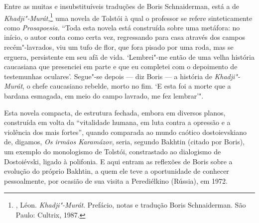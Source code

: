 Entre as muitas e insubstituíveis traduções de Boris Schnaiderman, está
a de \emph{Khadji"-Murát},\footnote{, Léon. \emph{Khadji"-Murát}.
  Prefácio, notas e tradução Boris Schnaiderman. São Paulo: Cultrix,
  1987.} uma novela de Tolstói à qual o professor se refere
sinteticamente como \emph{Prosapoesia}. ``Toda esta novela está
construída sobre uma metáfora: no início, o autor conta como certa vez,
regressando para casa através dos campos recém"-lavrados, viu um tufo de
flor, que fora pisado por uma roda, mas se erguera, persistente em seu
afã de vida. `Lembrei"-me então de uma velha história caucasiana que
presenciei em parte e que eu completei com o depoimento de testemunhas
oculares'. Segue"-se depois --- diz Boris --- a história de
\emph{Khadji"-Murát}, o chefe caucasiano rebelde, morto no fim. `E esta
foi a morte que a bardana esmagada, em meio do campo lavrado, me fez
lembrar'".

Esta novela compacta, de estrutura fechada, embora em diversos planos,
construída em volta da ``vitalidade humana, em luta contra a opressão e
a violência dos mais fortes'', quando comparada ao mundo caótico
dostoievskiano de, digamos, \emph{Os irmãos Karamázov}, seria, segundo
Bakhtin (citado por Boris), um exemplo do monologismo de Tolstói,
constrastado ao dialogismo de Dostoiévski, ligado à polifonia. E aqui
entram as reflexões de Boris sobre a evolução do próprio Bakhtin, a quem
ele teve a oportunidade de conhecer pessoalmente, por ocasião de sua
visita a Perediélkino (Rússia), em 1972.

